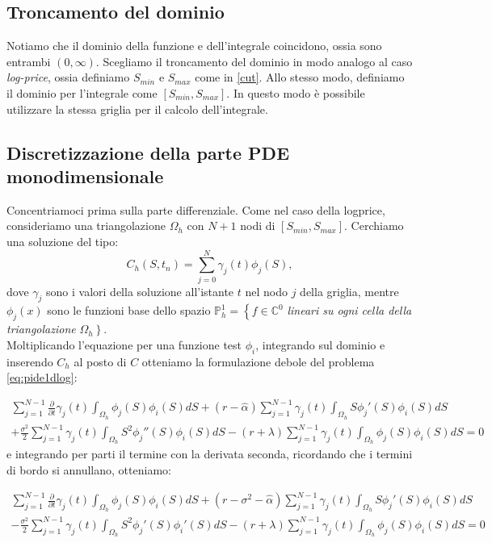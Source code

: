 \documentclass[a4paper,10pt]{report}
\theoremstyle{plain}
\theoremstyle{definition}
\theoremstyle{remark}
\begin{document}
\subsection{Troncamento del dominio}

Notiamo che il dominio della funzione e dell'integrale coincidono, ossia sono entrambi $(0,\infty)$.
Scegliamo il troncamento del dominio in modo analogo al caso \emph{log-price}, ossia definiamo $S_{min}$ e $S_{max}$ come in \eqref{cut}. Allo stesso modo, definiamo il dominio per l'integrale come $[S_{min},S_{max}]$. In questo modo è possibile utilizzare la stessa griglia per il calcolo dell'integrale.

\subsection{Discretizzazione della parte PDE monodimensionale}
Concentriamoci prima sulla parte differenziale. Come nel caso della logprice, consideriamo una triangolazione $\Omega_h$ con $N+1$ nodi di $[S_{min},S_{max}]$.  Cerchiamo una soluzione del tipo: $$C_h(S,t_n)=\sum_{j=0}^{N}\gamma_j(t)\phi_j(S),$$ dove $\gamma_j$ sono i valori della soluzione all'istante $t$ nel nodo $j$ della griglia, mentre $\phi_j(x)$ sono le funzioni base dello spazio $\mathbb{P}_h^1=\left\{f\in\mathbb{C}^0\right.$ \emph{lineari su ogni cella della triangolazione} $\Omega_h\left.\right\}$.\\
Moltiplicando l'equazione per una funzione test $\phi_i$, integrando sul dominio e inserendo $C_h$ al posto di $C$ otteniamo la formulazione debole del problema \eqref{eq:pide1dlog}:

\begin{multline*}
\sum_{j=1}^{N-1}\frac{\partial}{\partial t}\gamma_j(t)\int_{\Omega_h}\phi_j(S)\phi_i(S)dS+(r-\hat{\alpha})\sum_{j=1}^{N-1}\gamma_j(t)\int_{\Omega_h}S\phi_j'(S)\phi_i(S)dS\\
+\frac{\sigma^2}{2} \sum_{j=1}^{N-1} \gamma_j(t)\int_{\Omega_h} S^2 \phi_j''(S)\phi_i(S)dS -(r+\lambda) \sum_{j=1}^{N-1}\gamma_j(t)\int_{\Omega_h}\phi_j(S)\phi_i(S)dS=0
\end{multline*}
e integrando per parti il termine con la derivata seconda, ricordando che i termini di bordo si annullano, otteniamo:

\begin{multline*}
\sum_{j=1}^{N-1}\frac{\partial}{\partial t}\gamma_j(t)\int_{\Omega_h}\phi_j(S)\phi_i(S)dS
+(r-\sigma^2-\hat{\alpha})\sum_{j=1}^{N-1}\gamma_j(t)\int_{\Omega_h}S\phi_j'(S)\phi_i(S)dS\\
-\frac{\sigma^2}{2}\sum_{j=1}^{N-1} \gamma_j(t)\int_{\Omega_h} S^2\phi_j'(S)\phi_i'(S)dS
-(r+\lambda)\sum_{j=1}^{N-1}\gamma_j(t)\int_{\Omega_h}\phi_j(S)\phi_i(S)dS=0
\end{multline*}
\end{document}
